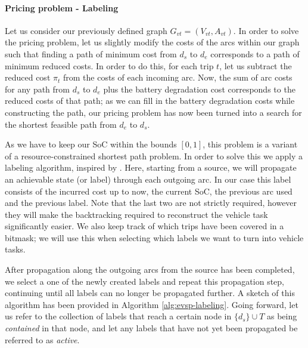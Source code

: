 \documentclass[]{article}
\begin{document}
\paragraph{Pricing problem - Labeling} \label{sec:labeling-evsp}
Let us consider our previously defined graph $G_{vt} = (V_{vt}, A_{vt})$. In order to solve the pricing problem, let us slightly modify the costs of the arcs within our graph such that finding a path of minimum cost from $d_s$ to $d_e$ corresponds to a path of minimum reduced costs. In order to do this, for each trip $t$, let us subtract the reduced cost $\pi_t$ from the costs of each incoming arc. Now, the sum of arc costs for any path from $d_s$ to $d_e$ plus the battery degradation cost corresponds to the reduced costs of that path; as we can fill in the battery degradation costs while constructing the path, our pricing problem has now been turned into a search for the shortest feasible path from $d_e$ to $d_s$.

As we have to keep our SoC within the bounds $[0, 1]$, this problem is a variant of a resource-constrained shortest path problem. In order to solve this we apply a labeling algorithm, inspired by \citet{Huang2016}. Here, starting from a source, we will propagate an achievable state (or label) through each outgoing arc. In our case this label consists of the incurred cost up to now, the current SoC, the previous arc used and the previous label. Note that the last two are not strictly required, however they will make the backtracking required to reconstruct the vehicle task significantly easier. We also keep track of which trips have been covered in a bitmask; we will use this when selecting which labels we want to turn into vehicle tasks. 

After propagation along the outgoing arcs from the source has been completed, we select a one of the newly created labels and repeat this propagation step, continuing until all labels can no longer be propagated further. A sketch of this algorithm has been provided in Algorithm \ref{alg:evsp-labeling}. Going forward, let us refer to the collection of labels that reach a certain node in $\{ d_s \} \cup T$ as being \textit{contained} in that node, and let any labels that have not yet been propagated be referred to as \emph{active}. 
\end{document}
